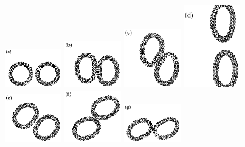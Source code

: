 \documentclass[lineno]{jfm}
\begin{document}
\begin{figure}[H]
\begin{center}
\includegraphics[width=0.22\textwidth]{N116_ext_0.eps}
\includegraphics[width=0.22\textwidth]{N116_ext_2500.eps}
\includegraphics[width=0.22\textwidth]{N116_ext_5000.eps}
\includegraphics[width=0.22\textwidth]{N116_ext_7500.eps}\\
\includegraphics[width=0.22\textwidth]{N116_shear_3000.eps}
\includegraphics[width=0.22\textwidth]{N116_shear_6000.eps}
\includegraphics[width=0.22\textwidth]{N116_shear_9000.eps}

\end{center}
\end{figure}
\end{document}
